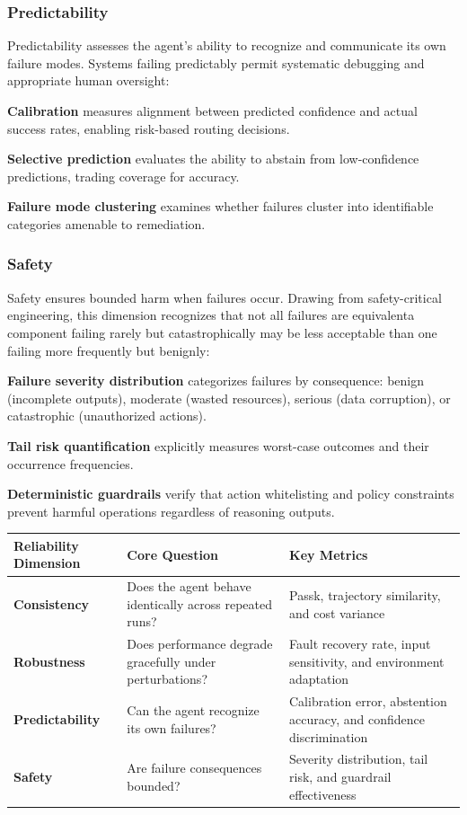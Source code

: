 \subsubsection{Predictability}

Predictability assesses the agent's ability to recognize and communicate its own failure modes. Systems failing predictably permit systematic debugging and appropriate human oversight:

\textbf{Calibration} measures alignment between predicted confidence and actual success rates, enabling risk-based routing decisions.

\textbf{Selective prediction} evaluates the ability to abstain from low-confidence predictions, trading coverage for accuracy.

\textbf{Failure mode clustering} examines whether failures cluster into identifiable categories amenable to remediation.

\subsubsection{Safety}

Safety ensures bounded harm when failures occur. Drawing from safety-critical engineering, this dimension recognizes that not all failures are equivalenta component failing rarely but catastrophically may be less acceptable than one failing more frequently but benignly:

\textbf{Failure severity distribution} categorizes failures by consequence: benign (incomplete outputs), moderate (wasted resources), serious (data corruption), or catastrophic (unauthorized actions).

\textbf{Tail risk quantification} explicitly measures worst-case outcomes and their occurrence frequencies.

\textbf{Deterministic guardrails} verify that action whitelisting and policy constraints prevent harmful operations regardless of reasoning outputs.

\begin{table}[tbp]
\centering
\footnotesize
\begin{tabularx}{\textwidth}{YYY}
\toprule
\textbf{Reliability Dimension} & \textbf{Core Question} & \textbf{Key Metrics} \\
\midrule
\textbf{Consistency} & Does the agent behave identically across repeated runs? & Passk, trajectory similarity, and cost variance \\
\textbf{Robustness} & Does performance degrade gracefully under perturbations? & Fault recovery rate, input sensitivity, and environment adaptation \\
\textbf{Predictability} & Can the agent recognize its own failures? & Calibration error, abstention accuracy, and confidence discrimination \\
\textbf{Safety} & Are failure consequences bounded? & Severity distribution, tail risk, and guardrail effectiveness \\
\bottomrule
\end{tabularx}
\end{table}

